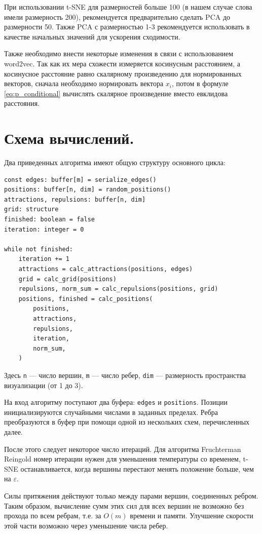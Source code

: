 При использовании t-SNE для размерностей больше 100 (в нашем случае слова имели размерность 200), рекомендуется предварительно сделать PCA до размерности 50. Также PCA с размерностью 1-3 рекомендуется использовать в качестве начальных значений для ускорения сходимости.

Также необходимо внести некоторые изменения в связи с использованием word2vec. Так как их мера схожести измеряется косинусным расстоянием, а косинусное расстояние равно скалярному произведению для нормированных векторов, сначала необходимо нормировать вектора $x_i$, потом в формуле \ref{eq:p_conditional} вычислять скалярное произведение вместо евклидова расстояния.

\section{Схема вычислений.}

Два приведенных алгоритма имеют общую структуру основного цикла:

\begin{verbatim}
const edges: buffer[m] = serialize_edges()
positions: buffer[n, dim] = random_positions()
attractions, repulsions: buffer[n, dim]
grid: structure
finished: boolean = false
iteration: integer = 0

while not finished:
    iteration += 1
    attractions = calc_attractions(positions, edges)
    grid = calc_grid(positions)
    repulsions, norm_sum = calc_repulsions(positions, grid)
    positions, finished = calc_positions(
        positions,
        attractions,
        repulsions,
        iteration,
        norm_sum,
    )
\end{verbatim}

Здесь \texttt{n} --- число вершин, \texttt{m} --- число ребер, \texttt{dim} --- размерность пространства визуализации (от 1 до 3).

На вход алгоритму поступают два буфера: \texttt{edges} и \texttt{positions}. Позиции инициализируются случайными числами в заданных пределах. Ребра преобразуются в буфер при помощи одной из нескольких схем, перечисленных далее.

После этого следует некоторое число итераций. Для алгоритма Fruchterman Reingold номер итерации нужен для уменьшения температуры со временем, t-SNE останавливается, когда вершины перестают менять положение больше, чем на $\varepsilon$.

Силы притяжения действуют только между парами вершин, соединенных ребром. Таким образом, вычисление сумм этих сил для всех вершин не возможно без прохода по всем ребрам, т.е. за $O(m)$ времени и памяти. Улучшение скорости этой части возможно через уменьшение числа ребер.

